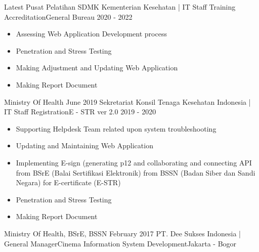 %
%
%
\begin{experiences}
  \experience
    {Latest}   {Pusat Pelatihan SDMK Kementerian Kesehatan | IT Staff }{Training Accreditation}{General Bureau}
    {2020 - 2022} {
                      \begin{itemize}
                        \item Assessing Web Application Development process                       
                        \item Penetration and Stress Testing                    
                        \item Making Adjustment and Updating Web Application               
                        \item Making Report Document                                                                   
                      \end{itemize}
                    }
                    {Ministry Of Health}
  \emptySeparator
  \experience
    {June 2019} {Sekretariat Konsil Tenaga Kesehatan Indonesia | IT Staff }{Registration}{E - STR ver 2.0}
    {2019 - 2020}    {
                      \begin{itemize}
                        \item Supporting Helpdesk Team related upon system troubleshooting                          
                        \item Updating and Maintaining Web Application                     
                        \item Implementing E-sign (generating p12 and collaborating and connecting API from BSrE (Balai Sertifikasi Elektronik) from BSSN (Badan Siber dan Sandi Negara) for E-certificate (E-STR) 
                        \item Penetration and Stress Testing 
                        \item Making Report Document                                                                   
                      \end{itemize}
                    }
                    {Ministry Of Health, BSrE, BSSN}
  \emptySeparator
  \experience
    {February 2017}     {PT. Dee Sukses Indonesia | General Manager}{Cinema Information System Development}{Jakarta - Bogor}

\end{experiences}

